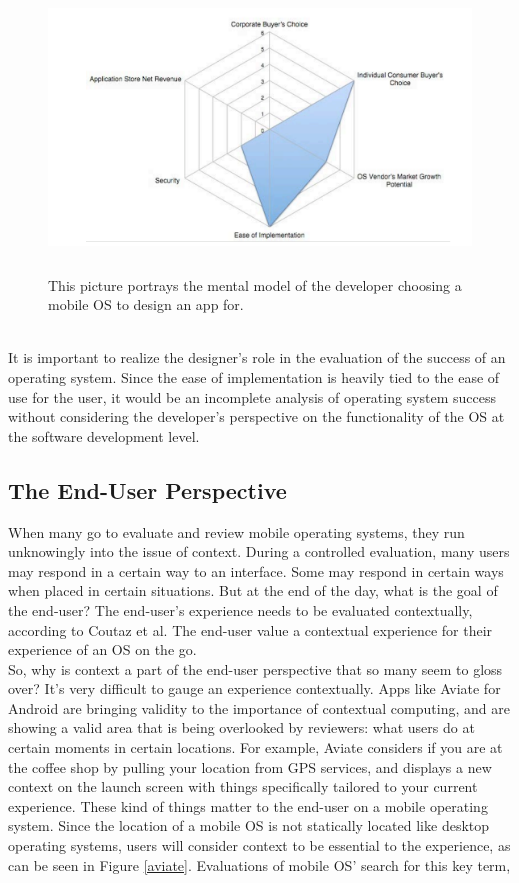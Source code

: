 \documentclass[11pt]{article}
\begin{document}
\begin{figure}[h]
\begin{center}
\includegraphics[height = 3in]{developerPerspective}
\caption{This picture portrays the mental model of the developer choosing a mobile OS to design an app for. \cite{Palme}}
\label{developerPerspective}
\end{center}
\end{figure} \\
It is important to realize the designer's role in the evaluation of the success of an operating system. Since the ease of implementation is heavily tied to the ease of use for the user, it would be an incomplete analysis of operating system success without considering the developer's perspective on the functionality of the OS at the software development level.

\subsection{The End-User Perspective}
When many go to evaluate and review mobile operating systems, they run unknowingly into the issue of context. During a controlled evaluation, many users may respond in a certain way to an interface. Some may respond in certain ways when placed in certain situations. But at the end of the day, what is the goal of the end-user? The end-user's experience needs to be evaluated contextually, according to Coutaz et al. The end-user value a contextual experience for their experience of an OS on the go. \cite{Coutaz} \\
\indent So, why is context a part of the end-user perspective that so many seem to gloss over? It's very difficult to gauge an experience contextually. Apps like Aviate for Android are bringing validity to the importance of contextual computing, and are showing a valid area that is being overlooked by reviewers: what users do at certain moments in certain locations. For example, Aviate considers if you are at the coffee shop by pulling your location from GPS services, and displays a new context on the launch screen with things specifically tailored to your current experience. \cite{Aviate} These kind of things matter to the end-user on a mobile operating system. Since the location of a mobile OS is not statically located like desktop operating systems, users will consider context to be essential to the experience, as can be seen in Figure \ref{aviate}. Evaluations of mobile OS' search for this key term, 
\end{document}

